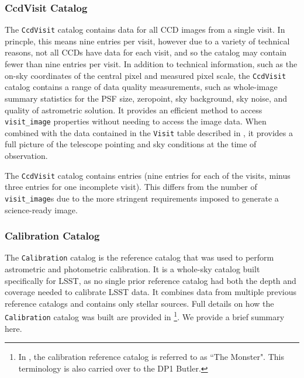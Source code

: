 \subsubsection{CcdVisit Catalog}
The \texttt{CcdVisit} catalog \citep{10.71929/rubin/2570331} contains data for all \gls{CCD} images from a single visit. In princple, this means nine entries per visit, however due to a variety of technical reasons, not all \gls{CCD}s have data for each visit, and so the catalog may contain fewer than nine entries per visit.
In addition to technical information, such as the on-sky coordinates of the central pixel and measured pixel scale, the \texttt{CcdVisit} catalog contains a range of data quality measurements, such as whole-image summary statistics for the \gls{PSF} size, zeropoint, sky \gls{background}, sky noise, and quality of astrometric solution.
It provides an efficient method to access \texttt{visit\_image} properties without needing to access the image data.
When combined with the data contained in the \texttt{Visit} table described in , it provides a full picture of the telescope pointing and sky conditions at the time of observation.

The \texttt{CcdVisit} catalog contains \nvisitdetectorsummaries entries (nine entries for each of the \nvisitsummaries visits, minus three entries for one incomplete visit). This differs from the number of \texttt{visit\_image}s due to the more stringent requirements imposed to generate a science-ready image.

\subsubsection{Calibration Catalog}
\label{sssec:monster}
The \texttt{Calibration} catalog is the reference catalog that was used to perform astrometric and photometric \gls{calibration}.
It is a whole-sky catalog built specifically for \gls{LSST}, as no single prior reference catalog had both the depth and coverage needed to calibrate \gls{LSST} data.
It combines data from multiple previous reference catalogs and contains only stellar sources.
Full details on how the \texttt{Calibration} catalog was built are provided in \cite{DMTN-277}
\footnote{In \cite{DMTN-277},  the calibration reference catalog is referred to as ``The Monster". This terminology is also carried over to the \gls{DP1} Butler.}.
We provide a brief summary here.

